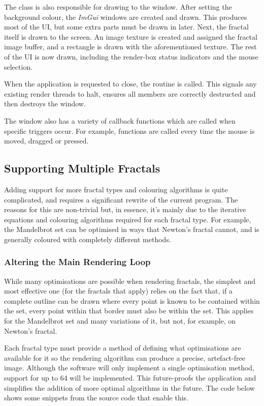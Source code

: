 The  class is also responsible for drawing to the window. After setting the background colour, the \textit{ImGui} windows are created and drawn. This produces most of the UI, but some extra parts must be drawn in later. Next, the fractal itself is drawn to the screen. An image texture is created and assigned the fractal image buffer, and a rectangle is drawn with the aforementioned texture. The rest of the UI is now drawn, including the render-box status indicators and the mouse selection.

When the application is requested to close, the  routine is called. This signals any existing render threads to halt, ensures all members are correctly destructed and then destroys the window.

The window also has a variety of callback functions which are called when specific triggers occur. For example, functions are called every time the mouse is moved, dragged or pressed.

\subsection{Supporting Multiple Fractals}

Adding support for more fractal types and colouring algorithms is quite complicated, and requires a significant rewrite of the current program. The reasons for this are non-trivial but, in essence, it's mainly due to the iterative equations and colouring algorithms required for each fractal type. For example, the Mandelbrot set can be optimised in ways that Newton's fractal cannot, and is generally coloured with completely different methods.

\subsubsection{Altering the Main Rendering Loop}

While many optimisations are possible when rendering fractals, the simplest and most effective one (for the fractals that apply) relies on the fact that, if a complete outline can be drawn where every point is known to be contained within the set, every point within that border must also be within the set. This applies for the Mandelbrot set and many variations of it, but not, for example, on Newton's fractal.

Each fractal type must provide a method of defining what optimisations are available for it so the rendering algorithm can produce a precise, artefact-free image. Although the software will only implement a single optimisation method, support for up to 64 will be implemented. This future-proofs the application and simplifies the addition of more optimal algorithms in the future. The code below shows some snippets from the source code that enable this.

